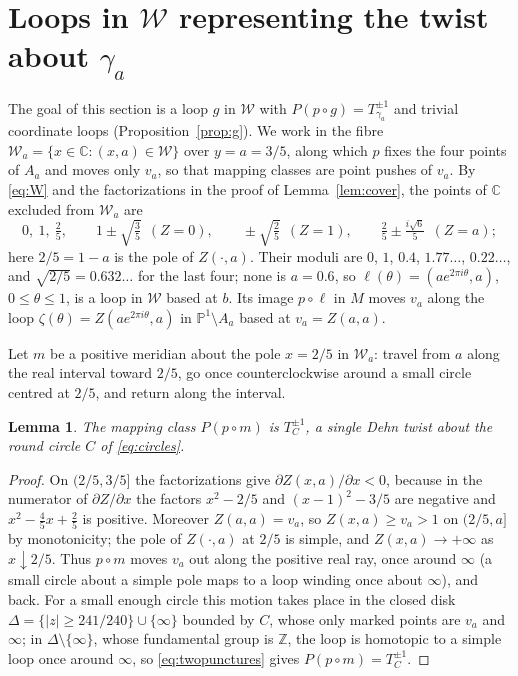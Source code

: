 \documentclass[12pt]{article}
\newcommand{\Pone}{\mathbb P^1}
\newcommand{\C}{\mathbb C}
\newcommand{\Z}{\mathbb Z}
\newcommand{\W}{\mathcal W}
\newtheorem{lemma}[theorem]{Lemma}
\theoremstyle{remark}
\numberwithin{equation}{section}
\begin{document}
\section{Loops in \texorpdfstring{$\W$}{W} representing the twist about
\texorpdfstring{$\gamma_a$}{gamma\_a}}\label{sec:loops}

The goal of this section is a loop $g$ in $\W$ with
$P(p\circ g)=T_{\gamma_a}^{\pm1}$ and trivial coordinate loops
(Proposition~\ref{prop:g}). We work in the fibre
$\W_a=\{x\in\C:(x,a)\in\W\}$ over $y=a=3/5$, along which $p$ fixes the
four points of $A_a$ and moves only $v_a$, so that mapping classes are
point pushes of $v_a$. By \eqref{eq:W} and the
factorizations in the proof of Lemma~\ref{lem:cover}, the points of $\C$
excluded from $\W_a$ are
\begin{equation}\label{eq:forbidden}
 0,\ 1,\ \tfrac25,\qquad
 1\pm\sqrt{\tfrac35}\ \ (Z=0),\qquad
 \pm\sqrt{\tfrac25}\ \ (Z=1),\qquad
 \tfrac25\pm\tfrac{i\sqrt6}{5}\ \ (Z=a);
\end{equation}
here $2/5=1-a$ is the pole of $Z(\cdot,a)$. Their moduli are
$0$, $1$, $0.4$, $1.77\ldots$, $0.22\ldots$, and $\sqrt{2/5}=0.632\ldots$
for the last four; none is $a=0.6$, so
$\ell(\theta)=(ae^{2\pi i\theta},a)$, $0\le\theta\le1$, is a loop in $\W$
based at $b$. Its image $p\circ\ell$ in $M$ moves $v_a$ along the loop
$\zeta(\theta)=Z(ae^{2\pi i\theta},a)$ in $\Pone\setminus A_a$ based at
$v_a=Z(a,a)$.

Let $m$ be a positive meridian about the pole $x=2/5$ in $\W_a$: travel
from $a$ along the real interval toward $2/5$, go once counterclockwise
around a small circle centred at $2/5$, and return along the interval.

\begin{lemma}\label{lem:m}
The mapping class $P(p\circ m)$ is $T_C^{\pm1}$, a single Dehn twist about
the round circle $C$ of \eqref{eq:circles}.
\end{lemma}

\begin{proof}
On $(2/5,3/5]$ the factorizations give $\partial Z(x,a)/\partial x<0$,
because in the numerator of $\partial Z/\partial x$ the factors $x^2-2/5$
and $(x-1)^2-3/5$ are negative and $x^2-\frac45x+\frac25$ is positive.
Moreover $Z(a,a)=v_a$, so $Z(x,a)\ge v_a>1$ on $(2/5,a]$ by
monotonicity; the pole of $Z(\cdot,a)$
at $2/5$ is simple, and $Z(x,a)\to+\infty$ as
$x\downarrow2/5$. Thus $p\circ m$ moves $v_a$ out along the positive real
ray, once around $\infty$ (a small circle about a simple pole maps to a
loop winding once about $\infty$), and back. For a small enough circle this motion takes place in the closed disk
$\Delta=\{|z|\ge241/240\}\cup\{\infty\}$ bounded by $C$, whose only marked
points are $v_a$ and $\infty$; in $\Delta\setminus\{\infty\}$, whose
fundamental group is $\Z$, the loop is homotopic to a simple loop once
around $\infty$, so \eqref{eq:twopunctures} gives $P(p\circ m)=T_C^{\pm1}$.
\end{proof}
\end{document}
